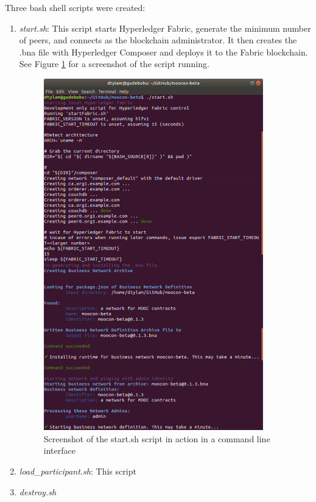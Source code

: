Three bash shell scripts were created:
\begin{enumerate}
	\setlength\itemsep{0em}    
    \item \textit{start.sh}: This script starts Hyperledger Fabric, generate the minimum number of peers, 
    and connects as the blockchain administrator. It then creates the .bna file with Hyperledger Composer 
    and deploys it to the Fabric blockchain.
    See Figure \ref{fig:startsh} for a screenshot of the script running.
    \begin{figure}[!ht] 
        \centering    
        \includegraphics[width=0.9\textwidth]{startsh}
        \caption[Blockchain Startup Script Screenshot]
            {Screenshot of the start.sh script in action in a command line interface}
        \label{fig:startsh}
    \end{figure}
    \item \textit{load\_participant.sh}: This script
    \item \textit{destroy.sh}
\end{enumerate}


